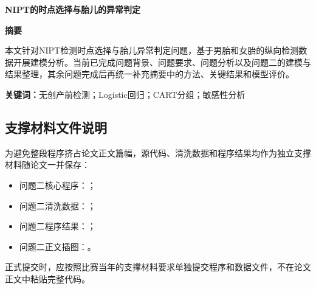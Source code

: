 \documentclass[UTF8,a4paper,12pt,fontset=fandol]{ctexart}
\begin{document}
\setcounter{page}{1}

\begin{center}
  {\bfseries NIPT的时点选择与胎儿的异常判定}
\end{center}

\begin{center}
  {\bfseries 摘\quad 要}
\end{center}

本文针对NIPT检测时点选择与胎儿异常判定问题，基于男胎和女胎的纵向检测数据开展建模分析。当前已完成问题背景、问题要求、问题分析以及问题二的建模与结果整理，其余问题完成后再统一补充摘要中的方法、关键结果和模型评价。

\vspace{0.8em}
\noindent\textbf{关键词：}无创产前检测；Logistic回归；CART分组；敏感性分析

\newpage












\newpage
\begin{appendices}

\section{支撑材料文件说明}
为避免整段程序挤占论文正文篇幅，源代码、清洗数据和程序结果均作为独立支撑材料随论文一并保存：
\begin{itemize}
  \item 问题二核心程序：；
  \item 问题二清洗数据：；
  \item 问题二程序结果：；
  \item 问题二正文插图：。
\end{itemize}
正式提交时，应按照比赛当年的支撑材料要求单独提交程序和数据文件，不在论文正文中粘贴完整代码。

\end{appendices}
\end{document}
